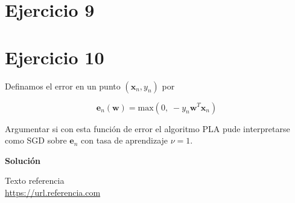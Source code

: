 \documentclass[11pt,a4paper]{article}
\newcommand{\answer}{\noindent\textbf{Solución}}
\newcommand{\maximum}{\text{max}}
\begin{document}
\section*{Ejercicio 9}

\section*{Ejercicio 10}

\noindent Definamos el error en un punto $(\mathbf{x}_n, y_n)$ por

\[\mathbf{e}_n(\mathbf{w}) = \maximum(0, \; -y_n\mathbf{w}^T\mathbf{x}_n)\] 

\noindent Argumentar si con esta función de error el algoritmo PLA pude interpretarse como SGD sobre $\mathbf{e}_n$ con tasa
de aprendizaje $\nu = 1$.

\answer

\newpage

\begin{thebibliography}{5}

Texto referencia
\\\url{https://url.referencia.com}

\end{thebibliography}
\end{document}
